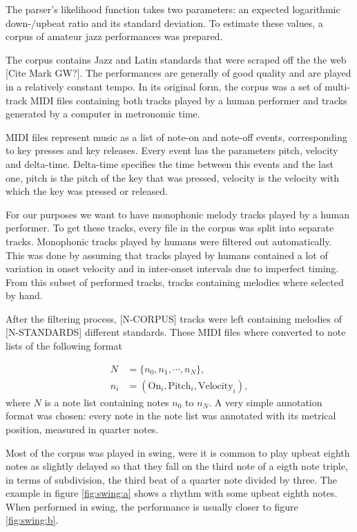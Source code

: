 The parser's likelihood function takes two parameters: an expected logarithmic down-/upbeat ratio and its standard deviation. To estimate these values, a corpus of amateur jazz performances was prepared.

The corpus contains Jazz and Latin standards that were scraped off the the web [Cite Mark GW?]. The performances are generally of good quality and are played in a relatively constant tempo. In its original form, the corpus was a set of multi-track MIDI files containing both tracks played by a human performer and tracks generated by a computer in metronomic time.

MIDI files represent music as a list of note-on and note-off events, corresponding to key presses and key releases. Every event has the parameters pitch, velocity and delta-time. Delta-time specifies the time between this events and the last one, pitch is the pitch of the key that was pressed, velocity is the velocity with which the key was pressed or released.

For our purposes we want to have monophonic melody tracks played by a human performer. To get these tracks, every file in the corpus was split into separate tracks. Monophonic tracks played by humans were filtered out automatically. This was done by assuming that tracks played by humans contained a lot of variation in onset velocity and in inter-onset intervals due to imperfect timing. From this subset of performed tracks, tracks containing melodies where selected by hand. 

After the filtering process, [N-CORPUS] tracks were left containing melodies of [N-STANDARDS] different standards. These MIDI files where converted to note lists of the following format

\begin{align*}
N &= \{n_0, n_1, \cdots, n_N\},\\
n_i &= (\mathrm{On}_i, \mathrm{Pitch}_i, \mathrm{Velocity}_i),
\end{align*}
where $N$ is a note list containing notes $n_0$ to $n_N$. A very simple annotation format was chosen: every note in the note list was annotated with its metrical position, measured in quarter notes. 

Most of the corpus was played in swing, were it is common to play upbeat eighth notes as slightly delayed so that they fall on the third note of a eigth note triple, in terms of subdivision, the third beat of a quarter note divided by three. The example in figure \ref{fig:swing:a} shows a rhythm with some upbeat eighth notes. When performed in swing, the performance is usually closer to figure \ref{fig:swing:b}.


